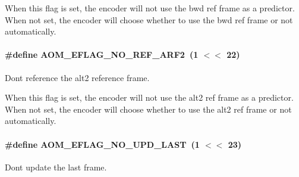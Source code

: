When this flag is set, the encoder will not use the bwd ref frame as a predictor. When not set, the encoder will choose whether to use the bwd ref frame or not automatically. 
\paragraph[{\texorpdfstring{A\+O\+M\+\_\+\+E\+F\+L\+A\+G\+\_\+\+N\+O\+\_\+\+R\+E\+F\+\_\+\+A\+R\+F2}{AOM_EFLAG_NO_REF_ARF2}}]{\setlength{\rightskip}{0pt plus 5cm}\#define A\+O\+M\+\_\+\+E\+F\+L\+A\+G\+\_\+\+N\+O\+\_\+\+R\+E\+F\+\_\+\+A\+R\+F2~(1 $<$$<$ 22)}\hypertarget{group__aom__encoder_gad04799a74215e1b9609f7ccd1766f8c9}{}\label{group__aom__encoder_gad04799a74215e1b9609f7ccd1766f8c9}


Don\textquotesingle{}t reference the alt2 reference frame. 

When this flag is set, the encoder will not use the alt2 ref frame as a predictor. When not set, the encoder will choose whether to use the alt2 ref frame or not automatically. 
\paragraph[{\texorpdfstring{A\+O\+M\+\_\+\+E\+F\+L\+A\+G\+\_\+\+N\+O\+\_\+\+U\+P\+D\+\_\+\+L\+A\+ST}{AOM_EFLAG_NO_UPD_LAST}}]{\setlength{\rightskip}{0pt plus 5cm}\#define A\+O\+M\+\_\+\+E\+F\+L\+A\+G\+\_\+\+N\+O\+\_\+\+U\+P\+D\+\_\+\+L\+A\+ST~(1 $<$$<$ 23)}\hypertarget{group__aom__encoder_ga7a55a46970c074b761319c5c46d87b6e}{}\label{group__aom__encoder_ga7a55a46970c074b761319c5c46d87b6e}


Don\textquotesingle{}t update the last frame. 

